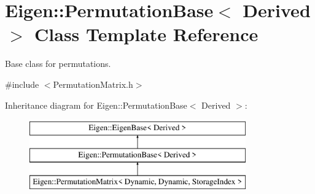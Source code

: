 \hypertarget{class_eigen_1_1_permutation_base}{}\section{Eigen\+::Permutation\+Base$<$ Derived $>$ Class Template Reference}
\label{class_eigen_1_1_permutation_base}


Base class for permutations.  




{\ttfamily \#include $<$Permutation\+Matrix.\+h$>$}

Inheritance diagram for Eigen\+::Permutation\+Base$<$ Derived $>$\+:\begin{figure}[H]
\begin{center}
\leavevmode
\includegraphics[height=3.000000cm]{class_eigen_1_1_permutation_base}
\end{center}
\end{figure}

